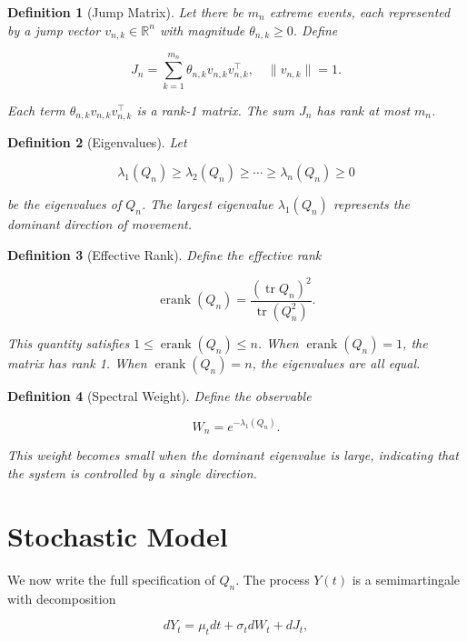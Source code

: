 \documentclass{article}
\newtheorem{definition}{Definition}
\begin{document}
\begin{definition}[Jump Matrix]
Let there be \(m_n\) extreme events, each represented by a jump vector \(v_{n,k} \in \mathbb{R}^n\) with magnitude \(\theta_{n,k} \ge 0\). Define

\[
J_n = \sum_{k=1}^{m_n} \theta_{n,k} v_{n,k} v_{n,k}^\top, \quad \|v_{n,k}\| = 1.
\]

Each term \(\theta_{n,k} v_{n,k} v_{n,k}^\top\) is a rank-1 matrix. The sum \(J_n\) has rank at most \(m_n\).
\end{definition}

\begin{definition}[Eigenvalues]
Let

\[
\lambda_1(Q_n) \ge \lambda_2(Q_n) \ge \cdots \ge \lambda_n(Q_n) \ge 0
\]

be the eigenvalues of \(Q_n\). The largest eigenvalue \(\lambda_1(Q_n)\) represents the dominant direction of movement.
\end{definition}

\begin{definition}[Effective Rank]
Define the effective rank

\[
\operatorname{erank}(Q_n) = \frac{(\operatorname{tr} Q_n)^2}{\operatorname{tr}(Q_n^2)}.
\]

This quantity satisfies \(1 \le \operatorname{erank}(Q_n) \le n\). When \(\operatorname{erank}(Q_n) = 1\), the matrix has rank 1. When \(\operatorname{erank}(Q_n) = n\), the eigenvalues are all equal.
\end{definition}

\begin{definition}[Spectral Weight]
Define the observable

\[
W_n = e^{-\lambda_1(Q_n)}.
\]

This weight becomes small when the dominant eigenvalue is large, indicating that the system is controlled by a single direction.
\end{definition}

\section{Stochastic Model}

We now write the full specification of \(Q_n\). The process \(Y(t)\) is a semimartingale with decomposition

\[
dY_t = \mu_t dt + \sigma_t dW_t + dJ_t,
\]
\end{document}
